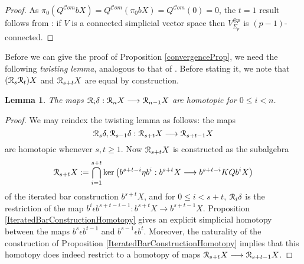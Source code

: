 \documentclass[11pt]{amsart} \renewcommand{\baselinestretch}{1.2}
\theoremstyle{plain}
\newtheorem{lem}[thm]{Lemma}
\theoremstyle{definition}
\renewcommand{\ker}{\mathrm{ker}\,}
\renewcommand{\to}{\longrightarrow}
\newcommand{\scrC}{\mathscr{C}}
\newcommand{\calR}{\mathcal{R}}
\newcommand{\algs}{{\scrC\!\textit{om}}}
\newcommand{\caldup}[1]{\calR_{\smash{#1}}}
\newcommand{\barConstructionMightAbbreviate}{b}
\begin{document}
\begin{Bousfield-Kan spectral sequence}
\begin{proof}
%
As $\pi_0(Q^{\algs}\barConstructionMightAbbreviate X)=Q^{\algs}(\pi_0\barConstructionMightAbbreviate X)=Q^{\algs}(0)=0$, %
the $t=1$ result follows from \cite[Satz 12.1]{DoldPuppeSuspension.pdf}: if $V$ is a connected simplicial vector space then $V^{\otimes p}_{\Sigma_p}$ is $(p-1)$-connected. 
\end{proof}
Before we can give the proof of Proposition \ref{convergenceProp}, we need the following \emph{twisting lemma}, analogous to that of \cite{BK_pairings.pdf}. Before stating it, we note that $(\caldup{s}\caldup{t})X$ and $\caldup{s+t}X$ are equal by construction.
\begin{lem}
\label{DsDt=Dt+s}
The maps $\caldup{i}\delta:\caldup{n}X\to \caldup{n-1}X$ are homotopic for $0\leq i< n$.
\end{lem}
\begin{proof}
We may reindex the twisting lemma as follows: the maps 
\[\caldup{s}\delta,\caldup{s-1}\delta:\caldup{s+t}X\to \caldup{s+t-1}X\]
are homotopic whenever $s,t\geq1$. Now $\caldup{s+t}X$ is constructed as the subalgebra
\[\caldup{s+t}X:= \bigcap_{i=1}^{s+t}\ker\!\left(\barConstructionMightAbbreviate^{s+t-i}\eta \barConstructionMightAbbreviate^{i}:\barConstructionMightAbbreviate^{s+t}X\to \barConstructionMightAbbreviate^{s+t-i}KQ\barConstructionMightAbbreviate^{i}X\right)\]
of the iterated bar construction $\barConstructionMightAbbreviate^{s+t}X$, and for $0\leq i<s+t$, $\caldup{i}\delta$ is the restriction of the map $\barConstructionMightAbbreviate^i\epsilon \barConstructionMightAbbreviate^{s+t-i-1}:\barConstructionMightAbbreviate^{s+t}X\to \barConstructionMightAbbreviate^{s+t-1}X$.
Proposition \ref{IteratedBarConstructionHomotopy} gives an explicit simplicial homotopy between the maps $\barConstructionMightAbbreviate^s\epsilon \barConstructionMightAbbreviate^{t-1}$ and $\barConstructionMightAbbreviate^{s-1}\epsilon \barConstructionMightAbbreviate^{t}$. Moreover, the naturality of the construction of Proposition \ref{IteratedBarConstructionHomotopy} implies that this homotopy does indeed restrict to a homotopy of maps $\caldup{s+t}X\to \caldup{s+t-1}X$.
\end{proof}



\end{Bousfield-Kan spectral sequence}
\end{document}
